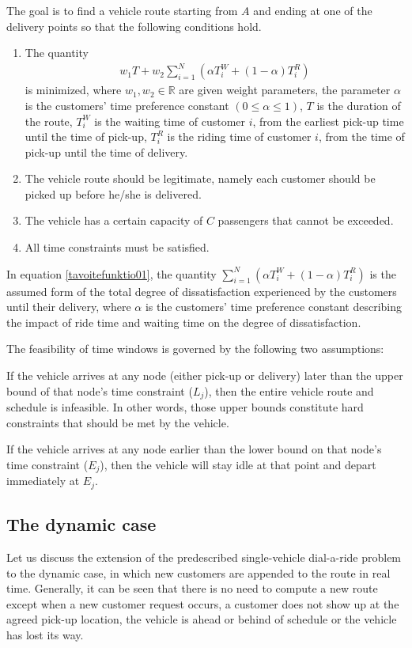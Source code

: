 \documentclass[dissertation,draft*]{aaltoseries}
\begin{document}
The goal is to find a vehicle route starting from $A$ and ending at one of
the delivery points so that the following conditions hold.
\begin{enumerate}
\item
The quantity
\begin{align}
\label{tavoitefunktio01}
w_1 T + w_2 \sum_{i=1}^N (\alpha T_i^W + (1-\alpha) T_i^R)
\end{align}
is minimized, where
$w_1,w_2 \in \mathbb{R}$ are given weight parameters,
the parameter $\alpha$ is the customers' time preference constant $(0 \leq \alpha \leq 1)$,
$T$ is the duration of the route,
$T_i^W$ is the waiting time of customer $i$, from the earliest pick-up time until the time of pick-up,
$T_i^R$ is the riding time of customer $i$, from the time of pick-up until the time of delivery.
\item
The vehicle route should be legitimate, namely each customer should be picked
up before he/she is delivered.
\item
The vehicle has a certain capacity of $C$ passengers that cannot be exceeded.
\item
All time constraints must be satisfied.
\end{enumerate}

In equation \eqref{tavoitefunktio01}, the quantity $\sum_{i=1}^N (\alpha T_i^W + (1-\alpha) T_i^R)$ is the assumed
form of the total degree of dissatisfaction experienced by the customers
until their delivery, where $\alpha$ is the customers' time preference
constant describing the impact of ride time and waiting time on the degree of
dissatisfaction. 

The feasibility of time windows is governed by the following two assumptions:
 
	If the vehicle arrives at any node (either pick-up or delivery)
	later than the upper bound of that node's time constraint ($L_j$),
	then the entire vehicle route and schedule is infeasible. In other words,
	those upper bounds constitute hard constraints that should be met
	by the vehicle. 


	If the vehicle arrives at any node earlier
	than the lower bound on that node's time constraint ($E_j$),
	then the vehicle will stay idle at that point and depart immediately 
	at $E_j$. 


\subsection{The dynamic case}
\label{dynamicdarp}
Let us discuss the extension of the predescribed single-vehicle dial-a-ride problem to 
the dynamic case, in which new customers are appended to the route in real time.
Generally, it can be seen that there is no need to compute a new route
except when a new customer request occurs, a customer does not show up at the agreed pick-up location,
the vehicle is ahead or behind of schedule or the vehicle has lost its way. 
\end{document}
